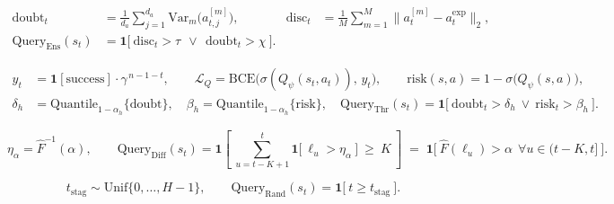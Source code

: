 \begin{align}
\mathrm{doubt}_t&=\tfrac1{d_a}\!\sum_{j=1}^{d_a}\mathrm{Var}_{m}\big(a^{[m]}_{t,j}\big),
&
\mathrm{disc}_t&=\tfrac1M\!\sum_{m=1}^{M}\big\|a^{[m]}_t-a^{\mathrm{exp}}_t\big\|_2, \nonumber\\
\mathrm{Query}_{\mathrm{Ens}}(s_t)&=\mathbf{1}\big[\ \mathrm{disc}_t>\tau\ \ \lor\ \ \mathrm{doubt}_t>\chi\ \big]. &&
\label{eq:ensemble}
\end{align}

\begin{align}
y_t&=\mathbf{1}[\mathrm{success}]\cdot\gamma^{\,n-1-t},
\qquad
\mathcal{L}_Q=\mathrm{BCE}\big(\sigma(Q_\psi(s_t,a_t)),\,y_t\big),
\qquad
\mathrm{risk}(s,a)=1-\sigma\!\big(Q_\psi(s,a)\big), \nonumber\\
\delta_h&=\mathrm{Quantile}_{1-\alpha_h}\{\mathrm{doubt}\},\quad
\beta_h=\mathrm{Quantile}_{1-\alpha_h}\{\mathrm{risk}\},\quad
\mathrm{Query}_{\mathrm{Thr}}(s_t)=\mathbf{1}\big[\ \mathrm{doubt}_t>\delta_h\ \lor\ \mathrm{risk}_t>\beta_h\ \big].
\label{eq:thrifty}
\end{align}

\begin{equation}
\eta_\alpha=\hat F^{-1}(\alpha),
\qquad
\mathrm{Query}_{\mathrm{Diff}}(s_t)=\mathbf{1}\!\left[\ \sum_{u=t-K+1}^{t}\mathbf{1}\big[\ \ell_u>\eta_\alpha\ \big]\ \ge\ K\ \right]
\;=\;\mathbf{1}\big[\ \hat F(\ell_u)>\alpha\ \ \forall u\in(t-K,t]\ \big].
\label{eq:diffdagger}
\end{equation}

\begin{equation}
t_{\mathrm{stag}}\sim\mathrm{Unif}\{0,\dots,H-1\},
\qquad
\mathrm{Query}_{\mathrm{Rand}}(s_t)=\mathbf{1}\big[\ t\ge t_{\mathrm{stag}}\ \big].
\label{eq:stagger}
\end{equation}



